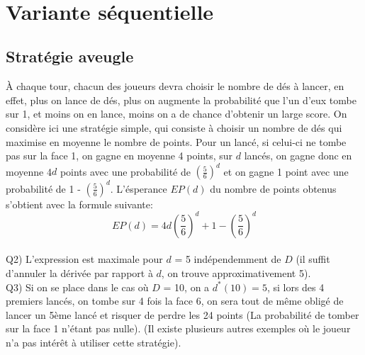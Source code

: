 \documentclass[12pt]{article}
\begin{document}
\begin{algorithm}
\caption{}
\begin{algorithmic}[1]
\Require 
\Function{}{}
\EndFunction
\Statex

\end{algorithmic}
\end{algorithm}
\newline
\\
\section{Variante séquentielle}
\subsection{Stratégie aveugle}
À chaque tour, chacun des joueurs devra choisir le nombre de dés à lancer, en effet, plus on lance de dés, plus on augmente la probabilité que l'un d'eux tombe sur 1, et moins on en lance, moins on a de chance d'obtenir un large score. On considère ici une stratégie simple, qui consiste à choisir un nombre de dés qui maximise en moyenne le nombre de points. Pour un lancé, si celui-ci ne tombe pas sur la face 1, on gagne en moyenne 4 points, sur $d$ lancés, on gagne donc en moyenne 4$d$ points avec une probabilité de $\left(\frac{5}{6}\right)^d$ et on gagne 1 point avec une probabilité de 1 - $\left(\frac{5}{6}\right)^d$. L'ésperance $EP(d)$ du nombre de points obtenus s'obtient avec la formule suivante: 
\newline
\\
$$EP(d) = 4d\left(\frac{5}{6}\right)^d + 1 - \left(\frac{5}{6}\right)^d$$
\newline
\\
Q2) L'expression est maximale pour $d$ = 5 indépendemment de $D$ (il suffit d'annuler la dérivée par rapport à $d$, on trouve approximativement 5).
\newline
\\
Q3) Si on se place dans le cas où $D$ = 10, on a $d^*(10) = 5$, si lors des 4 premiers lancés, on tombe sur 4 fois la face 6, on sera tout de même obligé de lancer un 5ème lancé et risquer de perdre les 24 points (La probabilité de tomber sur la face 1 n'étant pas nulle). (Il existe plusieurs autres exemples où le joueur n'a pas intérêt à utiliser cette stratégie).
\end{document}
